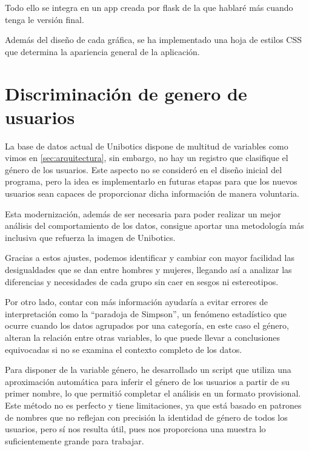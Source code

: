 \documentclass[a4paper, 12pt]{book}
\begin{document}
Todo ello se integra en un app creada por flask de la que hablaré más cuando tenga le versión final.

Además del diseño de cada gráfica, se ha implementado una hoja de estilos CSS que determina la apariencia general de la aplicación.

\section{Discriminación de genero de usuarios}

La base de datos actual de Unibotics dispone de multitud de variables como vimos en \ref{sec:arquitectura}, sin embargo, no hay un registro que clasifique el género de los usuarios. Este aspecto no se consideró en el diseño inicial del programa, pero la idea es implementarlo en futuras etapas para que los nuevos usuarios sean capaces de proporcionar dicha información de manera voluntaria.

Esta modernización, además de ser necesaria para poder realizar un mejor análisis del comportamiento de los datos, consigue aportar una metodología más inclusiva que refuerza la imagen de Unibotics.

Gracias a estos ajustes, podemos identificar y cambiar con mayor facilidad las desigualdades que se dan entre hombres y mujeres, llegando así a analizar las diferencias y necesidades de cada grupo sin caer en sesgos ni estereotipos.

Por otro lado, contar con más información ayudaría a evitar errores de interpretación como la “paradoja de Simpson”\cite{simpsonParadoxWikipedia}, un fenómeno estadístico que ocurre cuando los datos agrupados por una categoría, en este caso el género, alteran la relación entre otras variables, lo que puede llevar a conclusiones equivocadas si no se examina el contexto completo de los datos.

Para disponer de la variable género, he desarrollado un script que utiliza una aproximación automática para inferir el género de los usuarios a partir de su primer nombre, lo que permitió completar el análisis en un formato provisional. Este método no es perfecto y tiene limitaciones, ya que está basado en patrones de nombres que no reflejan con precisión la identidad de género de todos los usuarios, pero sí nos resulta útil, pues nos proporciona una muestra lo suficientemente grande para trabajar.
\end{document}
